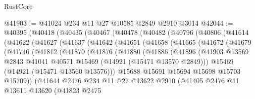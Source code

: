 \begin{lexlean}{RustCore}
\begin{coremodule}
@41903 := @41024 @234 @11 @27 @10585 @2849 @2910 @3014
@42044 := @40395
    (@40418
      (@40435
        (@40467
          (@40478
            (@40482
              (@40796
                (@40806
                  (@41614
                    (@41622
                      (@41627
                        (@41637
                          (@41642
                            (@41651
                              (@41658
                                (@41665
                                  (@41672
                                    (@41679
                                      (@41746
                                        (@41812
                                          (@41870
                                            (@41876
                                              (@41880
                                                (@41886
                                                  (@41896
                                                    (@41903
                                                      @13569
                                                      @2843
                                                      @41041
                                                      @40571
                                                      @15469
                                                      (@14921 (@15471 @13570 @2849)))
                                                    @15469
                                                    (@14921 (@15471 @13560 @13576)))
                                                  @15688
                                                  @15691
                                                  @15694
                                                  @15698
                                                  @15703
                                                  @15709))
                                              (@41644
                                                @2476
                                                @234
                                                @11
                                                @27
                                                @13622
                                                @2910
                                                (@41405
                                                  @2476
                                                  @11
                                                  @13611
                                                  @13620
                                                  (@41823
                                                    @2475

\end{coremodule}
\end{lexlean}
